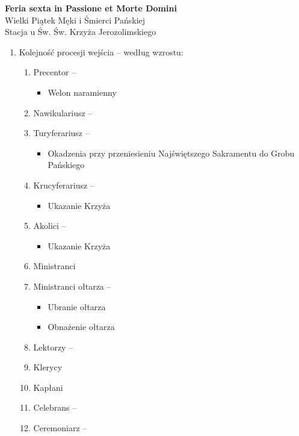 \documentclass[10pt,oneside,final,notitlepage,a4paper,wide]{mwart}
\begin{document}
%
\begin{center}
	\LARGE{\textbf{Feria sexta in Passione et Morte Domini}}\\ \smallskip
	\small{Wielki Piątek Męki i Śmierci Pańskiej\\ \smallskip Stacja u Św. Św. Krzyża Jerozolimskiego}
\end{center} \vspace{1cm}

\begin{enumerate}
	\item Kolejność procesji wejścia -- według wzrostu:
	\begin{enumerate}
		\item Precentor --
			\begin{itemize}
				\item Welon naramienny
			\end{itemize}
		\item Nawikulariusz -- 
		\item Turyferariusz --
			\begin{itemize}
				\item Okadzenia przy przeniesieniu Najświętszego Sakramentu do Grobu Pańskiego
			\end{itemize}
		\item Krucyferariusz --
			\begin{itemize}
				\item Ukazanie Krzyża
			\end{itemize}
		\item Akolici --
			\begin{itemize}
				\item Ukazanie Krzyża
			\end{itemize}
		\item Ministranci
		\item Ministranci ołtarza --
			\begin{itemize}
				\item Ubranie ołtarza
				\item Obnażenie ołtarza
			\end{itemize}
		\item Lektorzy -- 
		\item Klerycy
		\item Kapłani
		\item Celebrans -- 
		\item Ceremoniarz -- 
	\end{enumerate}

\end{enumerate}
\end{document}
